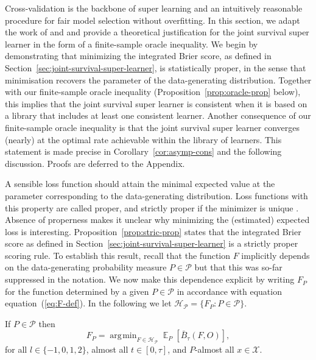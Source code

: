 \documentclass[lineno]{biometrika}
\DeclareMathOperator{\E}{\mathbb{E}} %
\newcommand{\1}{\mathds{1}}
\DeclareMathOperator*{\argmin}{\arg\!\min}
\begin{document}
Cross-validation is the backbone of super learning and an intuitively
reasonable procedure for fair model selection without overfitting. In
this section, we adapt the work of \cite{van2003unicv} and
\cite{vaart2006oracle} and provide a theoretical justification for the
joint survival super learner in the form of a finite-sample oracle
inequality. We begin by demonstrating that minimizing the integrated
Brier score, as defined in
Section~\ref{sec:joint-survival-super-learner}, is statistically
proper, in the sense that minimisation recovers the parameter of the
data-generating distribution. Together with our finite-sample oracle
inequality (Proposition~\ref{prop:oracle-prop} below), this implies
that the joint survival super learner is consistent when it is based
on a library that includes at least one consistent learner. Another
consequence of our finite-sample oracle inequality is that the joint
survival super learner converges (nearly) at the optimal rate
achievable within the library of learners. This statement is made
precise in Corollary~\ref{cor:asymp-cons} and the following
discussion. Proofs are deferred to the Appendix.

A sensible loss function should attain the minimal expected value at
the parameter corresponding to the data-generating distribution. Loss
functions with this property are called proper, and strictly proper if
the minimizer is unique \citep{gneiting2007strictly}. Absence of
properness makes it unclear why minimizing the (estimated) expected
loss is interesting.  Proposition~\ref{prop:stric-prop} states that
the integrated Brier score as defined in
Section~\ref{sec:joint-survival-super-learner} is a strictly proper
scoring rule. To establish this result, recall that the function \(F\)
implicitly depends on the data-generating probability measure
\(P\in\mathcal P\) but that this was so-far suppressed in the
notation. We now make this dependence explicit by writing \(F_P\) for
the function determined by a given \(P \in\mathcal{P}\) in accordance
with equation equation~(\ref{eq:F-def}). In the following we let \(
\mathcal{H}_{\mathcal{P}} = \{F_P : P \in \mathcal{P}\} \).

\begin{proposition}
  \label{prop:stric-prop}
  If \(P \in\mathcal{P}\) then
  \begin{equation*}
    F_P = \argmin_{F \in \mathcal{H}_{\mathcal{P}}}
    \E_P{[\bar{B}_\tau(F, O)]}
    ,
  \end{equation*}
  for all \( l \in \{-1, 0, 1, 2 \} \), almost all
  \( t \in [0,\tau] \), and \( P \)-almost all
  \( x \in \mathcal{X} \).
\end{proposition}
\end{document}
